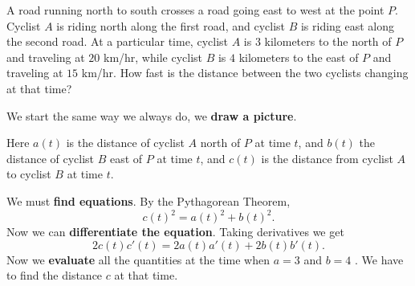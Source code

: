 \documentclass{ximera}
\begin{document}
\begin{example}
A road running north to south crosses a road going east to west at the
point $P$.  Cyclist $A$ is riding north along the first road, and
cyclist $B$ is riding east along the second road.  At a particular
time, cyclist $A$ is $3$ kilometers to the north of $P$ and traveling
at $20$ km/hr, while cyclist $B$ is $4$ kilometers to the east of $P$
and traveling at $15$ km/hr.  How fast is the distance between the two
cyclists changing at that time?


\begin{explanation}
We start the same way we always do, we \textbf{draw a picture}.
\begin{image}
\end{image}
Here $a(t)$ is the distance of cyclist $A$ north of $P$ at time $t$,
and $b(t)$ the distance of cyclist $B$ east of $P$ at time $t$, and
$c(t)$ is the distance from cyclist $A$ to cyclist $B$ at time $t$.

We must \textbf{find equations}.  By the Pythagorean Theorem,
\[
c(t)^2=a(t)^2+b(t)^2.
\] 
Now we can \textbf{differentiate the equation}. Taking derivatives we
get
\[
2c(t)c'(t)=2a(t)a'(t)+2b(t)b'(t).
\]
Now we  \textbf{evaluate} all the quantities at the time when $a=3$ and $b=4$ .  We have to find the distance $c$ at that time.
\begin{image}
\end{image}
\end{explanation}
\end{example}
\end{document}
